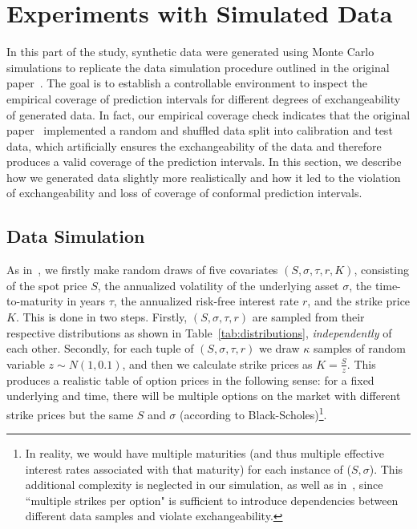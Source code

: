 \documentclass{article}
\theoremstyle{definition}
\begin{document}
\section{Experiments with Simulated Data}
In this part of the study, synthetic data were generated using Monte Carlo simulations to replicate the data simulation procedure outlined in the original paper~\cite{bastos}. The goal is to establish a controllable environment to inspect the empirical coverage of prediction intervals for different degrees of exchangeability of generated data. In fact, our empirical coverage check indicates that the original paper~\cite{bastos} implemented a random and shuffled data split into calibration and test data, which artificially ensures the exchangeability of the data and therefore produces a valid coverage of the prediction intervals. In this section, we describe how we generated data slightly more realistically and how it led to the violation of exchangeability and loss of coverage of conformal prediction intervals.

\subsection{Data Simulation} %

As in~\cite{bastos}, we firstly make random draws of five covariates $(S, \sigma, \tau, r, K)$, consisting of the spot price $S$, the annualized volatility of the underlying asset $\sigma$, the time-to-maturity in years $\tau$, the annualized risk-free interest rate $r$, and the strike price $K$. This is done in two steps. Firstly, $(S, \sigma, \tau, r)$ are sampled from their respective distributions as shown in Table~\ref{tab:distributions}, \emph{independently} of each other. Secondly, for each tuple of  $(S, \sigma, \tau, r)$ we draw $\kappa$ samples of random variable $z \sim N(1, 0.1)$, and then we calculate strike prices as $K = \frac{S}{z}$. This produces a realistic table of option prices in the following sense: for a fixed underlying and time, there will be multiple options on the market with different strike prices but the same $S$ and $\sigma$ (according to Black-Scholes)\footnote{In reality, we would have multiple maturities (and thus multiple effective interest rates associated with that maturity) for each instance of ($S, \sigma$). This additional complexity is neglected in our simulation, as well as in~\cite{bastos}, since ``multiple strikes per option" is sufficient to introduce dependencies between different data samples and violate exchangeability.}.
\end{document}

